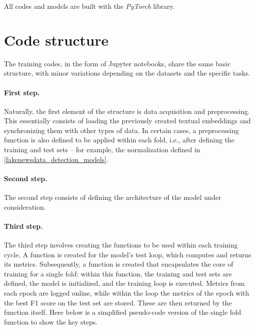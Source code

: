 \documentclass[a4paper,twoside,12pt]{book}
\begin{document}
All codes and models are built with the \emph{PyTorch} library.

\section*{Code structure}

The training codes, in the form of Jupyter notebooks, share the same basic structure, with minor variations depending on the datasets and the specific tasks.  

\paragraph{First step.} Naturally, the first element of the structure is data acquisition and preprocessing. This essentially consists of loading the previously created textual embeddings and synchronizing them with other types of data. In certain cases, a preprocessing function is also defined to be applied within each fold, i.e., after defining the training and test sets -- for example, the normalization defined in \ref{fakenewsdata_detection_models}.  

\paragraph{Second step.} The second step consists of defining the architecture of the model under consideration.  

\paragraph{Third step.} The third step involves creating the functions to be used within each training cycle. A function is created for the model’s test loop, which computes and returns its metrics. Subsequently, a function is created that encapsulates the core of training for a single fold: within this function, the training and test sets are defined, the model is initialized, and the training loop is executed. Metrics from each epoch are logged online, while within the loop the metrics of the epoch with the best F1 score on the test set are stored. These are then returned by the function itself. Here below is a simplified pseudo-code version of the single fold function to show the key steps.

\clearpage
\end{document}
